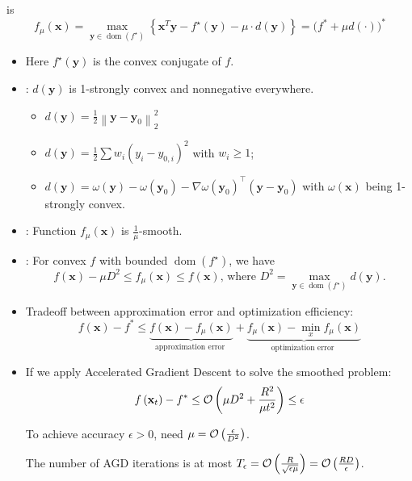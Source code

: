  is 
$$f_{\mu}(\mathbf{x})=\max _{\mathbf{y} \in \operatorname{dom}\left(f^{\star}\right)}\left\{\mathbf{x}^{T} \mathbf{y}-f^{\star}(\mathbf{y})-\mu \cdot d(\mathbf{y})\right\} = \bigl( f^* + \mu d(\cdot) \bigr)^*$$
\begin{itemize}[leftmargin=*]
    \item Here $f^{\star}(\mathbf{y})$ is the convex conjugate of $f$.
    \item {}: $d(\mathbf{y})$ is 1-strongly convex and nonnegative everywhere.
    \begin{itemize}[leftmargin=*]
        \item $ d(\mathbf{y})=\frac{1}{2}\left\|\mathbf{y}-\mathbf{y}_{0}\right\|_{2}^{2}$
        \item $ d(\mathbf{y})=\frac{1}{2} \sum w_{i}\left(y_{i}-y_{0, i}\right)^{2}$ with $w_{i} \geq 1$;
        \item $d(\mathbf{y})=\omega(\mathbf{y})-\omega\left(\mathbf{y}_{0}\right)-\nabla \omega\left(\mathbf{y}_{0}\right)^{\top}\left(\mathbf{y}-\mathbf{y}_{0}\right)$ with $\omega(\mathbf{x})$ being 1-strongly convex.
    \end{itemize}
    \item {}: Function $f_{\mu}(\mathbf{x})$ is $\frac{1}{\mu}$-smooth.
    \item {}: For convex $f$ with bounded $\operatorname{dom}\left(f^{\star}\right)$, we have
$$
f(\mathbf{x})-\mu D^{2} \leq f_{\mu}(\mathbf{x}) \leq f(\mathbf{x}) \text {, where } D^{2}=\max _{\mathbf{y} \in \operatorname{dom}\left(f^{\star}\right)} d(\mathbf{y}) .
$$
    \item Tradeoff between approximation error and optimization efficiency:
$$
f(\mathbf{x})-f^{*} \leq \underbrace{f(\mathbf{x})-f_{\mu}(\mathbf{x})}_{\text {approximation error }}+\underbrace{f_{\mu}(\mathbf{x})-\min _{x} f_{\mu}(\mathbf{x})}_{\text {optimization error }}
$$
    \item If we apply Accelerated Gradient Descent to solve the smoothed problem:
$$
f\left(\mathbf{x}_{t}\right)-f^{*} \leq \operatorname{\mathcal{O}}\left(\mu D^{2}+\frac{R^{2}}{\mu t^{2}}\right) \leq \epsilon
$$

To achieve accuracy $\epsilon>0$, need $\mu=\operatorname{\mathcal{O}}\left(\frac{\epsilon}{D^{2}}\right)$.

The number of AGD iterations is at most $T_{\epsilon}=\operatorname{\mathcal{O}}\left(\frac{R}{\sqrt{\epsilon \mu}}\right)=\operatorname{\mathcal{O}}\left(\frac{R D}{\epsilon}\right)$.
\end{itemize}





